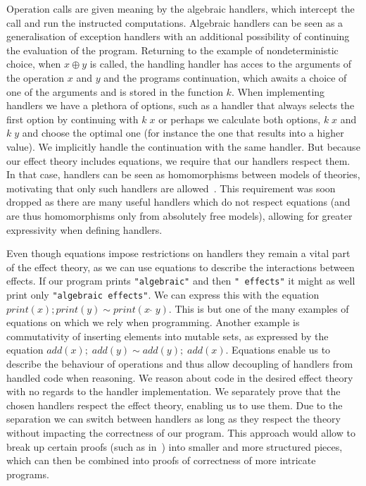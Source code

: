 \documentclass{article}
\begin{document}
Operation calls are given meaning by the algebraic handlers, which intercept the call and run the instructed computations. Algebraic handlers can be seen as a generalisation of exception handlers with an additional possibility of continuing the evaluation of the program. Returning to the example of nondeterministic choice, when $x \oplus y$ is called, the handling handler has acces to the arguments of the operation $x$ and $y$ and the programs continuation, which awaits a choice of one of the arguments and is stored in the function $k$. When implementing handlers we have a plethora of options, such as a handler that always selects the first option by continuing with $k \; x$ or perhaps we calculate both options, $k \; x$ and $k \; y$ and choose the optimal one (for instance the one that results into a higher value). We implicitly handle the continuation with the same handler. But because our effect theory includes equations, we require that our handlers respect them. In that case, handlers can be seen as homomorphisms between models of theories, motivating that only such handlers are allowed~\cite{DBLP:conf/esop/PlotkinP09}. This requirement was soon dropped as there are many useful handlers which do not respect equations (and are thus homomorphisms only from absolutely free models), allowing for greater expressivity when defining handlers.

Even though equations impose restrictions on handlers they remain a vital part of the effect theory, as we can use equations to describe the interactions between effects. If our program prints \texttt{"algebraic"} and then \texttt{" effects"} it might as well print only \texttt{"algebraic effects"}. We can express this with the equation $print(x); print(y) \sim print(x\;\hat{}\;y)$. This is but one of the many examples of equations on which we rely when programming. Another example is commutativity of inserting elements into mutable sets, as expressed by the equation $add(x);\; add(y) \sim add(y);\; add(x)$. Equations enable us to describe the behaviour of operations and thus allow decoupling of handlers from handled code when reasoning. We reason about code in the desired effect theory with no regards to the handler implementation. We separately prove that the chosen handlers respect the effect theory, enabling us to use them. Due to the separation we can switch between handlers as long as they respect the theory without impacting the correctness of our program. This approach would allow to break up certain proofs (such as in~\cite{DBLP:journals/jlp/BauerP15}) into smaller and more structured pieces, which can then be combined into proofs of correctness of more intricate programs.
\end{document}
